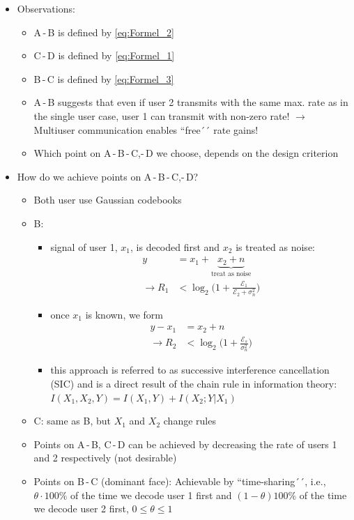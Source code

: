 \documentclass[a4paper, 10pt]{article}
\begin{document}
\begin{itemize}
	\item Observations:
	\begin{itemize}
		\item A\,-\,B is defined by \eqref{eq:Formel_2}
		\item C\,-\,D is defined by \eqref{eq:Formel_1}
		\item B\,-\,C is defined by \eqref{eq:Formel_3}
		\item A\,-\,B suggests that even if user 2 transmits with the same max. rate as in the single user case, user 1 can transmit with non-zero rate! $\rightarrow $ Multiuser communication enables ``free´´ rate gains!
		\item Which point on A\,-\,B\,-\,C,-\,D we choose, depends on the design criterion 	
	\end{itemize}		
	\item How do we achieve points on 	A\,-\,B\,-\,C,-\,D? 
	\begin{itemize}
		\item Both user use Gaussian codebooks
		\item B: 
		\begin{itemize}
			\item signal of user 1, $x_1$, is decoded first and $x_2 $ is treated as noise:
			\begin{align*}
				y &= x_1 + \underbrace{x_2 + n}_{\text{treat as noise}}\\ \rightarrow R_1 &< \log_2\bigl(1 + \frac{\mathcal{E}_1}{\mathcal{E}_2 + \sigma_n^2}\bigr)
			\end{align*}
			\item once $x_1 $ is known, we form 
			\begin{align*}
				y -x_1 &= x_2 + n\\ \rightarrow R_2 &< \log_2\bigl(1 + \frac{\mathcal{E}_s}{\sigma_n^2}\bigr)
			\end{align*}
			\item this approach is referred to as successive interference cancellation (SIC) and is a direct result of the chain rule in information theory:\\ $I(X_1, X_2, Y) = I(X_1, Y) + I(X_2; Y|X_1) $
		\end{itemize}
		\item C: same as B, but $X_1 $ and $X_2 $ change rules
		\item Points on A\,-\,B, C\,-\,D can be achieved by decreasing the rate of users 1 and 2 respectively (not desirable)
		\item Points on B\,-\,C (dominant face): Achievable by ``time-sharing´´, i.e., $\theta\cdot 100\% $ of the time we decode user 1 first and $(1 - \theta)100\% $ of the time we decode user 2 first, $ 0\leq \theta \leq 1 $ 

\end{itemize}
\end{itemize}
\end{document}
